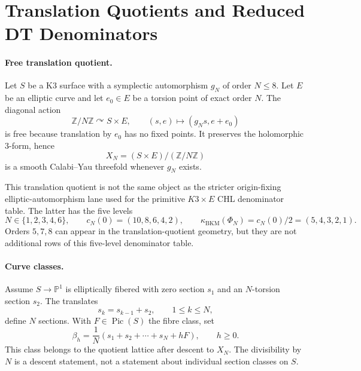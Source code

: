
\providecommand{\kcat}{\kappa_{\mathrm{cat}}}
\providecommand{\kch}{\kappa_{\mathrm{ch}}}
\providecommand{\kBKM}{\kappa_{\mathrm{BKM}}}
\providecommand{\kfiber}{\kappa_{\mathrm{fiber}}}
\providecommand{\Zpartition}{Z}
\providecommand{\gBKM}{\mathfrak{g}}
\providecommand{\DeltaFive}{\Delta_5}
\providecommand{\PhiTen}{\Phi_{10}^{\mathrm{un}}}

\section*{Translation Quotients and Reduced DT Denominators}

\paragraph{Free translation quotient.}
Let \(S\) be a K3 surface with a symplectic automorphism \(g_N\) of
order \(N\leq 8\). Let \(E\) be an elliptic curve and let \(e_0\in E\)
be a torsion point of exact order \(N\). The diagonal action
\[
  \mathbb Z/N\mathbb Z\curvearrowright S\times E,
  \qquad
  (s,e)\longmapsto(g_Ns,e+e_0)
\]
is free because translation by \(e_0\) has no fixed points. It
preserves the holomorphic \(3\)-form, hence
\[
  X_N=(S\times E)/(\mathbb Z/N\mathbb Z)
\]
is a smooth Calabi--Yau threefold whenever \(g_N\) exists.

This translation quotient is not the same object as the stricter
origin-fixing elliptic-automorphism lane used for the primitive
\(K3\times E\) CHL denominator table. The latter has the five levels
\[
  N\in\{1,2,3,4,6\},
  \qquad
  c_N(0)=(10,8,6,4,2),
  \qquad
  \kBKM(\Phi_N)=c_N(0)/2=(5,4,3,2,1).
\]
Orders \(5,7,8\) can appear in the translation-quotient geometry, but
they are not additional rows of this five-level denominator table.

\paragraph{Curve classes.}
Assume \(S\to\mathbb P^1\) is elliptically fibered with zero section
\(s_1\) and an \(N\)-torsion section \(s_2\). The translates
\[
  s_k=s_{k-1}+s_2,\qquad 1\leq k\leq N,
\]
define \(N\) sections. With \(F\in\operatorname{Pic}(S)\) the fibre
class, set
\[
  \beta_h=\frac1N(s_1+s_2+\cdots+s_N+hF),
  \qquad h\geq0.
\]
This class belongs to the quotient lattice after descent to \(X_N\).
The divisibility by \(N\) is a descent statement, not a statement about
individual section classes on \(S\).

